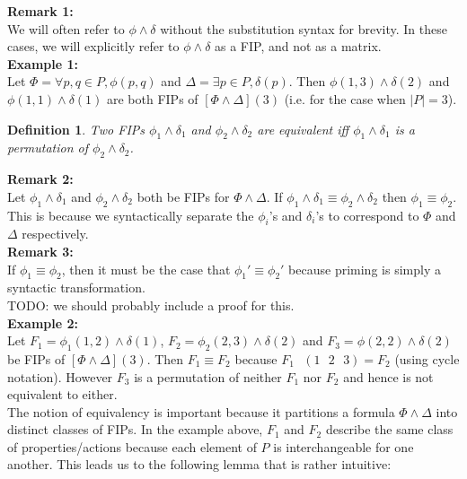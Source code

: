 \documentclass[12pt]{article}
\newtheorem{definition}{Definition}
\newcommand{\msp}{\text{ }}
\begin{document}
\noindent \textbf{Remark 1:}\\
We will often refer to $\phi\land\delta$ without the substitution syntax for brevity.  In these cases, we will explicitly refer to $\phi\land\delta$ as a FIP, and not as a matrix.\\

\noindent \textbf{Example 1:}\\
Let $\Phi = \forall p,q \in P, \phi(p,q)$ and $\Delta = \exists p \in P, \delta(p)$.  Then $\phi(1,3)\land\delta(2)$ and $\phi(1,1)\land\delta(1)$ are both FIPs of $[\Phi\land\Delta](3)$ (i.e. for the case when $|P|=3$).

\begin{definition}
  Two FIPs $\phi_1\land\delta_1$ and $\phi_2\land\delta_2$ are equivalent iff $\phi_1\land\delta_1$ is a permutation of $\phi_2\land\delta_2$.
\end{definition}

\noindent \textbf{Remark 2:}\\
Let $\phi_1\land\delta_1$ and $\phi_2\land\delta_2$ both be FIPs for $\Phi\land\Delta$.  If $\phi_1\land\delta_1 \equiv \phi_2\land\delta_2$ then $\phi_1 \equiv \phi_2$.  This is because we syntactically separate the $\phi_i$'s and $\delta_i$'s to correspond to $\Phi$ and $\Delta$ respectively.\\

\noindent \textbf{Remark 3:}\\
If $\phi_1 \equiv \phi_2$, then it must be the case that $\phi_1' \equiv \phi_2'$ because priming is simply a syntactic transformation.\\
TODO: we should probably include a proof for this.\\

\noindent \textbf{Example 2:}\\
Let $F_1 = \phi_1(1,2) \land \delta(1)$, $F_2 = \phi_2(2,3) \land \delta(2)$ and $F_3 = \phi(2,2) \land \delta(2)$ be FIPs of $[\Phi\land\Delta](3)$.  Then $F_1 \equiv F_2$ because $F_1 \msp (1 \msp 2 \msp 3) = F_2$ (using cycle notation).  However $F_3$ is a permutation of neither $F_1$ nor $F_2$ and hence is not equivalent to either.\\

The notion of equivalency is important because it partitions a formula $\Phi \land \Delta$ into distinct classes of FIPs.  In the example above, $F_1$ and $F_2$ describe the same class of properties/actions because each element of $P$ is interchangeable for one another.  This leads us to the following lemma that is rather intuitive:
\end{document}
